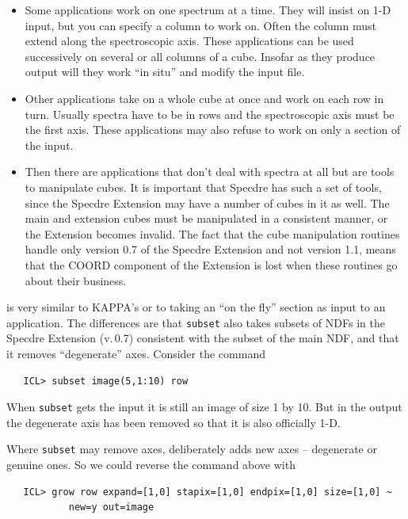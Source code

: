 \begin{itemize}
\item Some applications work on one spectrum at a time.  They will
   insist on 1-D input, but you can specify a column to work on.  Often
   the column must extend along the spectroscopic axis.  These
   applications can be used successively on several or all columns of a
   cube.  Insofar as they produce output will they work ``in situ'' and
   modify the input file.

\item Other applications take on a whole cube at once and work on each
   row in turn.  Usually spectra have to be in rows and the
   spectroscopic axis must be the first axis.  These applications may
   also refuse to work on only a section of the input.

\item Then there are applications that don't deal with spectra at all
   but are tools to manipulate cubes.  It is important that Specdre has
   such a set of tools, since the Specdre Extension may have a number of
   cubes in it as well.  The main and extension cubes must be
   manipulated in a consistent manner, or the Extension becomes invalid.
   The fact that the cube manipulation routines handle only version 0.7
   of the Specdre Extension and not version 1.1, means that the COORD
   component of the Extension is lost when these routines go about their
   business.
\end{itemize}

{\tt{}}
   is very similar to KAPPA's
{\tt{}}
   or to taking an ``on the fly'' section as input to an application.
   The differences are that {\tt subset} also takes subsets of NDFs in
   the Specdre Extension (v.\,0.7) consistent with the subset of the
   main NDF, and that it removes ``degenerate'' axes.  Consider the
   command

\begin{verbatim}
   ICL> subset image(5,1:10) row
\end{verbatim}

   When {\tt subset} gets the input it is still an image of size 1 by
   10.  But in the output the degenerate axis has been removed so that
   it is also officially 1-D.

   Where {\tt subset} may remove axes,
{\tt{}}
   deliberately adds new axes -- degenerate or genuine ones.  So we
   could reverse the command above with

\begin{verbatim}
   ICL> grow row expand=[1,0] stapix=[1,0] endpix=[1,0] size=[1,0] ~
           new=y out=image
\end{verbatim}

